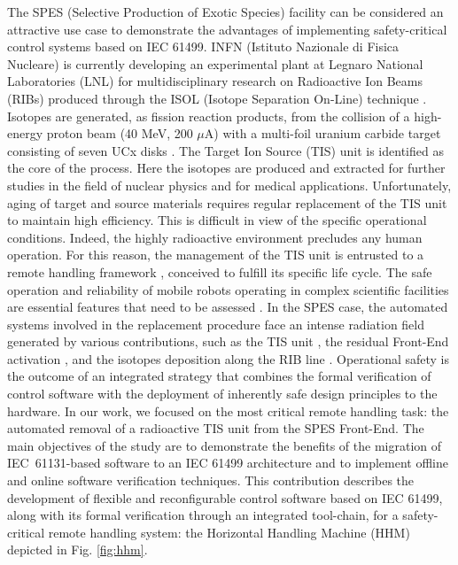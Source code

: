 \documentclass{ieeeojies}
\begin{document}
\noindent The SPES (Selective Production of Exotic Species) facility \cite{Marchietal.2020} can be considered an attractive use case to demonstrate the advantages of implementing safety-critical control systems based on IEC 61499. INFN (Istituto Nazionale di Fisica Nucleare) is currently developing an experimental plant at Legnaro National Laboratories (LNL) for multidisciplinary research on Radioactive Ion Beams (RIBs) produced through the ISOL (Isotope Separation On-Line) technique \cite{Andrighetto2018}. Isotopes are generated, as fission reaction products, from the collision of a high-energy proton beam (40 MeV, 200 $\mu$A) with a multi-foil uranium carbide target \cite{Andrighetto2019} consisting of seven UCx disks \cite{Corradetti2021}. The Target Ion Source (TIS) unit \cite{Monetti2015} is identified as the core of the process. Here the isotopes are produced and extracted for further studies in the field of nuclear physics and for medical applications. Unfortunately, aging of target and source materials requires regular replacement of the TIS unit to maintain high efficiency. This is difficult in view of the specific operational conditions. Indeed, the highly radioactive environment precludes any human operation.
For this reason, the management of the TIS unit is entrusted to a remote handling framework \cite{lilli2023}, conceived to fulfill its specific life cycle. The safe operation and reliability of mobile robots operating in complex scientific facilities are essential features that need to be assessed \cite{khan2014}. In the SPES case, the automated systems involved in the replacement procedure face an intense radiation field generated by various contributions, such as the TIS unit \cite{Monetti2015}, the residual Front-End activation \cite{Donzella2020}, and the isotopes deposition along the RIB line \cite{Centofante2021Study}. 
Operational safety is the outcome of an integrated strategy that combines the formal verification of control software with the deployment of inherently safe design principles to the hardware.
In our work, we focused on the most critical remote handling task: the automated removal of a radioactive TIS unit from the SPES Front-End.
The main objectives of the study are to demonstrate the benefits of the migration of \mbox{IEC 61131-based} software to an IEC 61499 architecture and to implement offline and online software verification techniques. This contribution describes the development of flexible and reconfigurable control software based on IEC 61499, along with its formal verification through an integrated tool-chain, for a safety-critical remote handling system: the Horizontal Handling Machine (HHM) depicted in Fig. \ref{fig:hhm}. 
\end{document}
